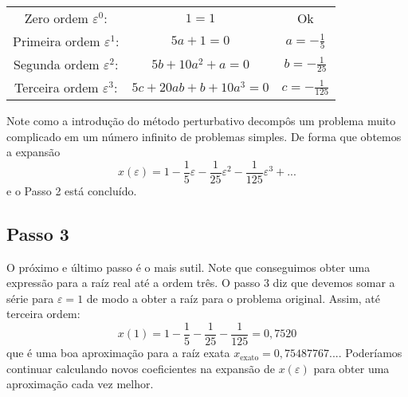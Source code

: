 \documentclass{article}
\begin{document}
\begin{center}
\begin{tabular}{ c c c }
 Zero ordem $\varepsilon^0$: & $1 = 1$ & Ok \\ 
 Primeira ordem $\varepsilon^1$: & $5a+1 = 0$ & $a = -\frac{1}{5}$ \\  
 Segunda ordem $\varepsilon^2$: & $5b+10a^2 + a = 0$ & $b = -\frac{1}{25}$ \\
 Terceira ordem $\varepsilon^3$: & $5c + 20ab + b + 10a^3 = 0$ & $c = -\frac{1}{125}$
\end{tabular}
\end{center}
Note como a introdução do método perturbativo decompôs um problema muito complicado em um número infinito de problemas simples. De forma que obtemos a expansão
\begin{equation}
    x(\varepsilon) = 1 - \frac{1}{5}\varepsilon - \frac{1}{25}\varepsilon^2 - \frac{1}{125}\varepsilon^3 + ...
\end{equation}
e o Passo 2 está concluído.

\subsection{Passo 3}

O próximo e último passo é o mais sutil. Note que conseguimos obter uma expressão para a raíz real até a ordem três. O passo 3 diz que devemos somar a série para $\varepsilon = 1$ de modo a obter a raíz para o problema original. Assim, até terceira ordem:
\begin{equation}
    x(1) = 1 - \frac{1}{5} - \frac{1}{25} - \frac{1}{125} = 0,7520
\end{equation}
que é uma boa aproximação para a raíz exata $x_\text{exato} = 0,75487767...$. Poderíamos continuar calculando novos coeficientes na expansão de $x(\varepsilon)$ para obter uma aproximação cada vez melhor.
\end{document}
